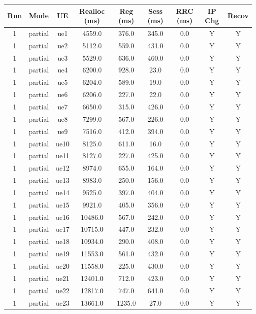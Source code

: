 \begin{table}[ht]
\centering
\begin{tabular}{|c|c|c|c|c|c|c|c|c|}
\hline
Run & Mode & UE & Realloc (ms) & Reg (ms) & Sess (ms) & RRC (ms) & IP Chg & Recov \\
\hline
1 & partial & ue1 & 4559.0 & 376.0 & 345.0 & 0.0 & Y & Y \\
1 & partial & ue2 & 5112.0 & 559.0 & 431.0 & 0.0 & Y & Y \\
1 & partial & ue3 & 5529.0 & 636.0 & 460.0 & 0.0 & Y & Y \\
1 & partial & ue4 & 6200.0 & 928.0 & 23.0 & 0.0 & Y & Y \\
1 & partial & ue5 & 6204.0 & 589.0 & 19.0 & 0.0 & Y & Y \\
1 & partial & ue6 & 6206.0 & 227.0 & 22.0 & 0.0 & Y & Y \\
1 & partial & ue7 & 6650.0 & 315.0 & 426.0 & 0.0 & Y & Y \\
1 & partial & ue8 & 7299.0 & 567.0 & 226.0 & 0.0 & Y & Y \\
1 & partial & ue9 & 7516.0 & 412.0 & 394.0 & 0.0 & Y & Y \\
1 & partial & ue10 & 8125.0 & 611.0 & 16.0 & 0.0 & Y & Y \\
1 & partial & ue11 & 8127.0 & 227.0 & 425.0 & 0.0 & Y & Y \\
1 & partial & ue12 & 8974.0 & 655.0 & 164.0 & 0.0 & Y & Y \\
1 & partial & ue13 & 8983.0 & 250.0 & 156.0 & 0.0 & Y & Y \\
1 & partial & ue14 & 9525.0 & 397.0 & 404.0 & 0.0 & Y & Y \\
1 & partial & ue15 & 9921.0 & 405.0 & 356.0 & 0.0 & Y & Y \\
1 & partial & ue16 & 10486.0 & 567.0 & 242.0 & 0.0 & Y & Y \\
1 & partial & ue17 & 10715.0 & 447.0 & 232.0 & 0.0 & Y & Y \\
1 & partial & ue18 & 10934.0 & 290.0 & 408.0 & 0.0 & Y & Y \\
1 & partial & ue19 & 11553.0 & 561.0 & 432.0 & 0.0 & Y & Y \\
1 & partial & ue20 & 11558.0 & 225.0 & 430.0 & 0.0 & Y & Y \\
1 & partial & ue21 & 12401.0 & 712.0 & 423.0 & 0.0 & Y & Y \\
1 & partial & ue22 & 12817.0 & 747.0 & 641.0 & 0.0 & Y & Y \\
1 & partial & ue23 & 13661.0 & 1235.0 & 27.0 & 0.0 & Y & Y \\

\end{tabular}
\end{table}
